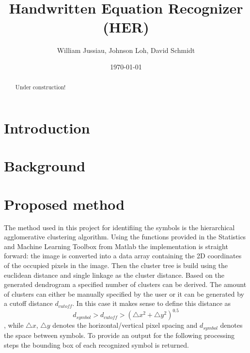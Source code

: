 \documentclass[twocolumn, twoside]{article}%
\title{Handwritten Equation Recognizer (HER)}
\author{William Jussiau, Johnson Loh, David Schmidt}
\date{\today}
\begin{document}
\begin{strip}
  \vspace*{\dimexpr-\baselineskip-\stripsep\relax}
  \centering
  \maketitle
  \vskip\baselineskip
  \vskip\baselineskip
\end{strip}


    \begin{abstract}
	    Under construction!
	\end{abstract}
	
	\section{Introduction}
	    
	\section{Background}
	    
	    
	\section{Proposed method}
		The method used in this project for identifiing the symbols is the hierarchical agglomerative clustering algorithm. Using the functions provided in the Statistics and Machine Learning Toolbox from Matlab the implementation is straight forward: the image is converted into a data array containing the 2D coordinates of the occupied pixels in the image. Then the cluster tree is build using the euclidean distance and single linkage as the cluster distance. Based on the generated dendrogram a specified number of clusters can be derived. The amount of clusters can either be manually specified by the user or it can be generated by a cutoff distance $d_{cutoff}$. In this case it makes sense to define this distance as
		\begin{equation}
		d_{symbol} > d_{cutoff} > (\triangle x^2 + \triangle y^2)^{0.5}
		\end{equation}
		, while $\triangle x$, $\triangle y$ denotes the horizontal/vertical pixel spacing and $d_{symbol}$ denotes the space between symbols. To provide an output for the following processing steps the bounding box of each recognized symbol is returned.
	
\end{document}
